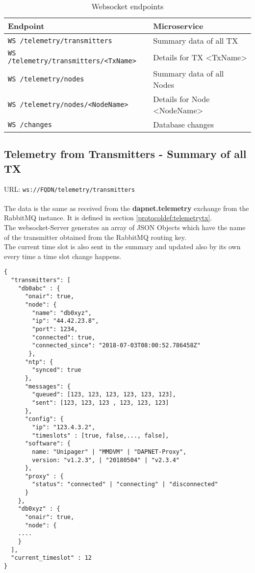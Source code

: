 \begin{table}[htbp]
  \label{tab:protocoldef:websocketapi}
  \begin{center}
    \begin{tabular}{|l|l|} \hline
      Endpoint & Microservice \\ \hline \hline
      \verb|WS /telemetry/transmitters| & Summary data of all TX \\ \hline
      \verb|WS /telemetry/transmitters/<TxName>| & Details for TX <TxName>\\ \hline
      \verb|WS /telemetry/nodes| & Summary data of all Nodes\\ \hline
      \verb|WS /telemetry/nodes/<NodeName>| & Details for Node <NodeName>\\ \hline
      \verb|WS /changes| & Database changes\\ \hline
    \end{tabular}
  \end{center}
  \caption{Websocket endpoints}
\end{table}


\subsection{Telemetry from Transmitters - Summary of all TX}
\label{protcoldef:websocketapi:telemetrytxsummary}
URL: \texttt{ws://FQDN/telemetry/transmitters}\\\\

The data is the same as received from the \textbf{dapnet.telemetry} exchange
from the RabbitMQ instance. It is defined in section
\ref{protocoldef:telemetrytx}.\\
The websocket-Server generates an array of JSON Objects which have the name of the transmitter obtained from the RabbitMQ routing key.\\
The current time slot is also sent in the summary and updated also by its own every time a time slot change happens.

\begin{lstlisting}
{
  "transmitters": [
    "db0abc" : {
      "onair": true,
      "node": {
        "name": "db0xyz",
        "ip": "44.42.23.8",
        "port": 1234,
        "connected": true,
        "connected_since": "2018-07-03T08:00:52.786458Z"
       },
      "ntp": {
        "synced": true
      },
      "messages": {
        "queued": [123, 123, 123, 123, 123, 123],
        "sent": [123, 123, 123 , 123, 123, 123]
      },
      "config": {
        "ip": "123.4.3.2",
        "timeslots" : [true, false,...,	false],
      "software": {
        name: "Unipager" | "MMDVM" | "DAPNET-Proxy",
        version: "v1.2.3", | "20180504" | "v2.3.4"
      },
      "proxy" : {
        "status": "connected" | "connecting" | "disconnected"
      }
    },
    "db0xyz" : {
      "onair": true,
      "node": {
    ....
    }        
  ],
  "current_timeslot" : 12
}
\end{lstlisting}

